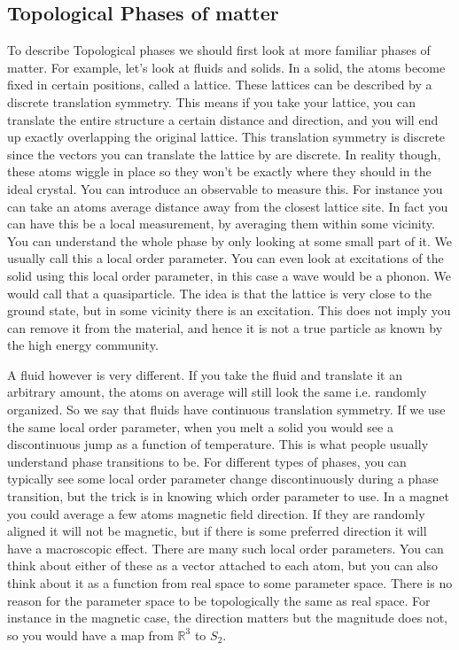 
\subsection{Topological Phases of matter}
	To describe Topological phases we should first look at more familiar phases of matter. For example, let's look at fluids and solids. In a solid, the atoms become fixed in certain positions, called a lattice. These lattices can be described by a discrete translation symmetry. This means if you take your lattice, you can translate the entire structure a certain distance and direction, and you will end up exactly overlapping the original lattice. This translation symmetry is discrete since the vectors you can translate the lattice by are discrete. In reality though, these atoms wiggle in place so they won't be exactly where they should in the ideal crystal. You can introduce an observable to measure this. For instance you can take an atoms average distance away from the closest lattice site. In fact you can have this be a local measurement, by averaging them within some vicinity. You can understand the whole phase by only looking at some small part of it. We usually call this a local order parameter. You can even look at excitations of the solid using this local order parameter, in this case a wave would be a phonon. We would call that a quasiparticle. The idea is that the lattice is very close to the ground state, but in some vicinity there is an excitation. This does not imply you can remove it from the material, and hence it is not a true particle as known by the high energy community. 
	
	A fluid however is very different. If you take the fluid and translate it an arbitrary amount, the atoms on average will still look the same i.e. randomly organized. So we say that fluids have continuous translation symmetry. If we use the same local order parameter, when you melt a solid you would see a discontinuous jump as a function of temperature. This is what people usually understand phase transitions to be.	For different types of phases, you can typically see some local order parameter change discontinuously during a phase transition, but the trick is in knowing which order parameter to use. In a magnet you could average a few atoms magnetic field direction. If they are randomly aligned it will not be magnetic, but if there is some preferred direction it will have a macroscopic effect. There are many such local order parameters. You can think about either of these as a vector attached to each atom, but you can also think about it as a function from real space to some parameter space. There is no reason for the parameter space to be topologically the same as real space. For instance in the magnetic case, the direction matters but the magnitude does not, so you would have a map from $\mathbb{R}^3$ to $S_2$.
	

